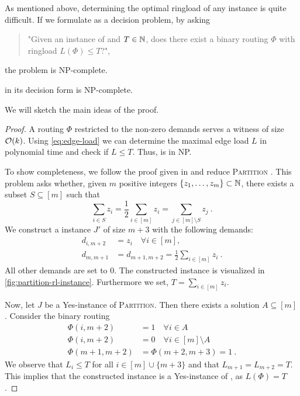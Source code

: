 As mentioned above, determining the optimal ringload of any \RL instance is quite difficult.
If we formulate \RL as a decision problem, by asking
\begin{quote}
	"Given an instance of \RL and $T \in \mathbb{N}$, does there exist a binary routing $\Phi$ with ringload $L(\Phi) \leq T$?",
\end{quote}
the problem is NP-complete.
\begin{theorem}
	\RL in its decision form is NP-complete.
\end{theorem}

We will sketch the main ideas of the proof.
\begin{proof}
	A routing $\Phi$ restricted to the non-zero demands serves a witness of size $\mathcal{O}(k)$.
	Using \cref{eq:edge-load} we can determine the maximal edge load $L$ in polynomial time and check if $L \leq T$.
	Thus, \RL is in NP.
	
	To show completeness, we follow the proof given in \cite{schrijver99} and reduce \textsc{Partition} \cite{karp72}.
	This problem asks whether, given $m$ positive integers $\{z_1, \ldots, z_m\} \subset \mathbb{N}$, there exists a subset $S \subseteq [m]$ such that 
	\begin{equation}
		\sum_{i \in S} z_i = \frac{1}{2}  \sum_{i \in [m]} z_i = \sum_{j \in [m] \setminus S} z_j\ .
	\end{equation}
	We construct a \RL instance $J'$ of size $m + 3$ with the following demands:
	\begin{align}
			d_{i, m+2} &= z_i \quad \forall i \in [m], \\
			d_{m, m+1} &= d_{m+1, m+2} = \frac{1}{2}  \sum_{i \in [m]} z_i \ . 
	\end{align}
	All other demands are set to $0$.
	The constructed instance is visualized in \cref{fig:partition-rl-instance}.
	Furthermore we set, $T = \sum_{i \in [m]} z_i$.
	
	Now, let $J$ be a Yes-instance of \textsc{Partition}.
	Then there exists a solution $A \subseteq [m]$.
	Consider the binary routing
	\begin{align}
		\Phi(i, m+2) &= 1 \quad \forall i \in A \\
		\Phi(i, m+2) &= 0 \quad \forall i \in [m] \setminus A \\
		\Phi(m+1, m+2) & = \Phi(m+2, m+3) = 1 \ .
	\end{align}
	We observe that $L_i \leq T$ for all $i \in [m] \cup \{m+3\}$ and that $L_{m+1} = L_{m+2} = T$.
	This implies that the constructed instance is a Yes-instance of \RL, as $L(\Phi) = T$.
	

\end{proof}
